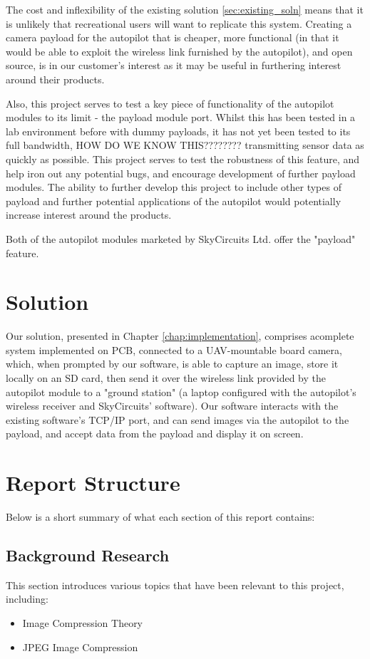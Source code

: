 The cost and inflexibility of the existing solution \ref{sec:existing_soln} means that it is unlikely that recreational users will want to replicate this system. Creating a camera payload for the autopilot that is cheaper, more functional (in that it would be able to exploit the wireless link furnished by the autopilot), and open source, is in our customer's interest as it may be useful in furthering interest around their products.

Also, this project serves to test a key piece of functionality of the autopilot modules to its limit - the payload module port. Whilst this has been tested in a lab environment before with dummy payloads, it has not yet been tested to its full bandwidth, HOW DO WE KNOW THIS???????? transmitting sensor data as quickly as possible. This project serves to test the robustness of this feature, and help iron out any potential bugs, and encourage development of further payload modules. The ability to further develop this project to include other types of payload and further potential applications of the autopilot would potentially increase interest around the products.

Both of the autopilot modules marketed by SkyCircuits Ltd. offer the "payload" feature.

\section{Solution}

Our solution, presented in Chapter \ref{chap:implementation}, comprises acomplete system implemented on PCB, connected to a UAV-mountable board camera, which, when prompted by our software, is able to capture an image, store it locally on an SD card, then send it over the wireless link provided by the autopilot module to a "ground station" (a laptop configured with the autopilot's wireless receiver and SkyCircuits' software). Our software interacts with the existing software's TCP/IP port, and can send images via the autopilot to the payload, and accept data from the payload and display it on screen.

\section{Report Structure}

Below is a short summary of what each section of this report contains:

\subsection{Background Research}
This section introduces various topics that have been relevant to this project, including:
\begin{itemize}
\item Image Compression Theory
\item JPEG Image Compression 
\end{itemize}

